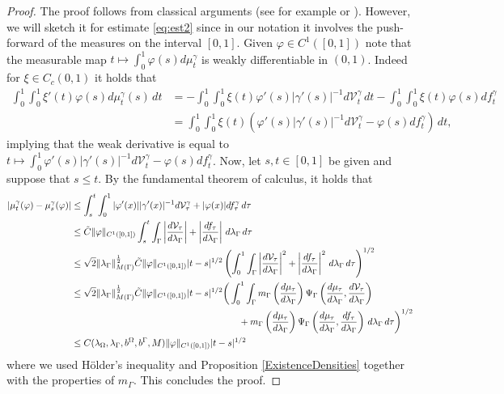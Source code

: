 \documentclass{article}
\begin{document}
\begin{proof}
    The proof follows from classical arguments (see for example \cite[Proposition 3.5]{monsaingeon2021new} or \cite[Lemma A.2]{bredies2020optimal}). However, we will sketch it for estimate \eqref{eq:est2} since in our notation it involves the push-forward of the measures on the interval $[0,1]$. Given $\varphi \in C^1([0,1])$ note that the measurable map $t \mapsto \int_0^1 \varphi(s) d\mu^\gamma_t$ is weakly differentiable in $(0,1)$. Indeed for $\xi \in C_c(0,1)$ it holds that
    \begin{align*}
        \int_0^1\int_0^1 \xi'(t) \varphi(s) d\mu^\gamma_t(s)\, dt & = - \int_0^1\int_0^1  \xi(t) \varphi'(s) |\gamma'(s)|^{-1}d\mathcal{V}^\gamma_t\, dt - \int_0^1\int_0^1 \xi(t) \varphi(s) df_t^\gamma \\
        & = \int_0^1\int_0^1   \xi(t)\left(\varphi'(s) |\gamma'(s)|^{-1}d\mathcal{V}^\gamma_t - \varphi(s) df^\gamma_t\right)\,dt,
    \end{align*}
    implying that the weak derivative is equal to $t \mapsto \int_0^1 \varphi'(s) |\gamma'(s)|^{-1}d\mathcal{V}^\gamma_t - \varphi(s) df^\gamma_t$. Now, let $s,t\in[0,1]$ be given and suppose that $s\leq t$. By the fundamental theorem of calculus, it holds that 
    \begin{align*}
    |\mu^\gamma_t(\varphi) - \mu^\gamma_s(\varphi)| & \leq \int_s^t \int_0^1 |\varphi'(x)| |\gamma'(x)|^{-1}d\mathcal{V}^\gamma_\tau + |\varphi(x)| df^\gamma_\tau\, d\tau\\
        & \leq \Tilde{C}\|\varphi\|_{C^1([0,1])} \int_s^t \int_\Gamma \left|\frac{d\mathcal{V}_\tau}{d\lambda_\Gamma}\right| + \left| \frac{df_\tau}{d\lambda_\Gamma}\right|\, d\lambda_\Gamma\, d\tau \\
        & \leq \sqrt{2} \| \lambda_\Gamma\|^{\frac{1}{2}}_{M(\Gamma)}\Tilde{C}\|\varphi\|_{C^1([0,1])} |t-s|^{1/2} \left(\int_0^1 \int_\Gamma\left|\frac{d\mathcal{V}_\tau}{d\lambda_\Gamma}\right|^2 + \left| \frac{df_\tau}{d\lambda_\Gamma}\right|^2\, d\lambda_\Gamma\, d\tau \right)^{1/2}\\
        & \leq \sqrt{2} \| \lambda_\Gamma\|^{\frac{1}{2}}_{M(\Gamma)}\Tilde{C}\|\varphi\|_{C^1([0,1])} |t-s|^{1/2} \bigg(\int_0^1 \int_\Gamma m_\Gamma\left(\frac{d\mu_\tau}{d\lambda_\Gamma}\right)\Psi_\Gamma\left(\frac{d\mu_\tau}{d\lambda_\Gamma}, \frac{d\mathcal{V}_\tau}{d\lambda_\Gamma}\right) \\
        & \qquad \qquad \qquad \qquad \qquad \qquad \qquad \qquad \qquad + m_\Gamma\left(\frac{d\mu_\tau}{d\lambda_\Gamma}\right)\Psi_\Gamma\left(\frac{d\mu_\tau}{d\lambda_\Gamma}, \frac{df_\tau}{d\lambda_\Gamma}\right)\, d\lambda_\Gamma\, d\tau\bigg)^{1/2}\\
        & \leq C(\lambda_\Omega, \lambda_\Gamma, b^\Omega, b^\Gamma,M) \|\varphi\|_{C^1([0,1])} |t-s|^{1/2}
    \end{align*}
     where we used Hölder's inequality and Proposition \ref{ExistenceDensities} together with the properties of $m_\Gamma$. This concludes the proof. 
\end{proof}
\end{document}
